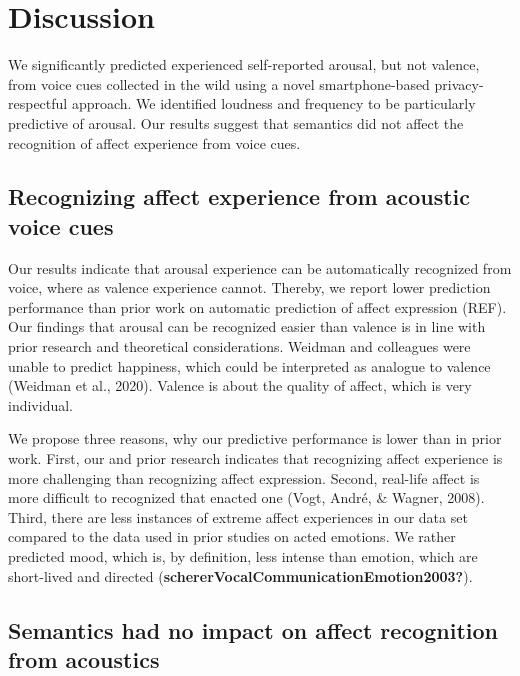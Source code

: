 \documentclass[
  english,
  man,floatsintext]{apa6}
\begin{document}
\hypertarget{discussion}{%
\section{Discussion}\label{discussion}}

We significantly predicted experienced self-reported arousal, but not valence, from voice cues collected in the wild using a novel smartphone-based privacy-respectful approach. We identified loudness and frequency to be particularly predictive of arousal. Our results suggest that semantics did not affect the recognition of affect experience from voice cues.

\hypertarget{recognizing-affect-experience-from-acoustic-voice-cues}{%
\subsection{Recognizing affect experience from acoustic voice cues}\label{recognizing-affect-experience-from-acoustic-voice-cues}}

Our results indicate that arousal experience can be automatically recognized from voice, where as valence experience cannot. Thereby, we report lower prediction performance than prior work on automatic prediction of affect expression (REF). Our findings that arousal can be recognized easier than valence is in line with prior research and theoretical considerations. Weidman and colleagues were unable to predict happiness, which could be interpreted as analogue to valence (Weidman et al., 2020). Valence is about the quality of affect, which is very individual.

We propose three reasons, why our predictive performance is lower than in prior work. First, our and prior research indicates that recognizing affect experience is more challenging than recognizing affect expression. Second, real-life affect is more difficult to recognized that enacted one (Vogt, André, \& Wagner, 2008). Third, there are less instances of extreme affect experiences in our data set compared to the data used in prior studies on acted emotions. We rather predicted mood, which is, by definition, less intense than emotion, which are short-lived and directed (\textbf{schererVocalCommunicationEmotion2003?}).

\hypertarget{semantics-had-no-impact-on-affect-recognition-from-acoustics}{%
\subsection{Semantics had no impact on affect recognition from acoustics}\label{semantics-had-no-impact-on-affect-recognition-from-acoustics}}
\end{document}
